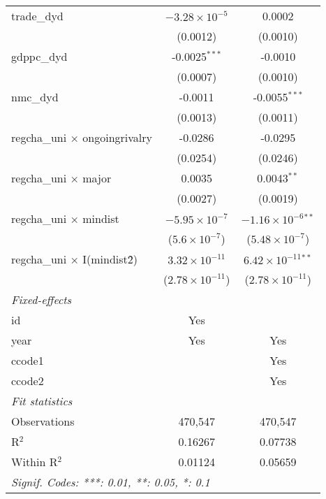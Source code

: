 \begin{tabular}{lcc}
   trade\_dyd                            & $-3.28\times 10^{-5}$    & 0.0002\\   
                                         & (0.0012)                 & (0.0010)\\   
   gdppc\_dyd                            & -0.0025$^{***}$          & -0.0010\\   
                                         & (0.0007)                 & (0.0010)\\   
   nmc\_dyd                              & -0.0011                  & -0.0055$^{***}$\\   
                                         & (0.0013)                 & (0.0011)\\   
   regcha\_uni $\times$ ongoingrivalry   & -0.0286                  & -0.0295\\   
                                         & (0.0254)                 & (0.0246)\\   
   regcha\_uni $\times$ major            & 0.0035                   & 0.0043$^{**}$\\   
                                         & (0.0027)                 & (0.0019)\\   
   regcha\_uni $\times$ mindist          & $-5.95\times 10^{-7}$    & $-1.16\times 10^{-6}$$^{**}$\\    
                                         & ($5.6\times 10^{-7}$)    & ($5.48\times 10^{-7}$)\\    
   regcha\_uni $\times$ I(mindist\^2)    & $3.32\times 10^{-11}$    & $6.42\times 10^{-11}$$^{**}$\\    
                                         & ($2.78\times 10^{-11}$)  & ($2.78\times 10^{-11}$)\\    
   \midrule
   \emph{Fixed-effects}\\
   id                                    & Yes                      & \\  
   year                                  & Yes                      & Yes\\  
   ccode1                                &                          & Yes\\  
   ccode2                                &                          & Yes\\  
   \midrule
   \emph{Fit statistics}\\
   Observations                          & 470,547                  & 470,547\\  
   R$^2$                                 & 0.16267                  & 0.07738\\  
   Within R$^2$                          & 0.01124                  & 0.05659\\  
   \midrule \midrule
   \multicolumn{3}{l}{\emph{Signif. Codes: ***: 0.01, **: 0.05, *: 0.1}}\\
\end{tabular}
\par\endgroup



